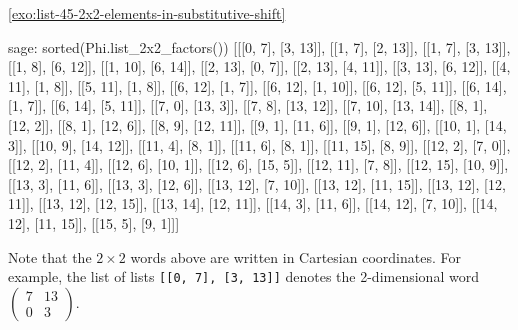 \documentclass[12pt]{amsart}
\begin{document}
\begin{exosolution}{\ref{exo:list-45-2x2-elements-in-substitutive-shift}}
\begin{sagecommandlinetcb}
\begin{sagecommandline}
sage: sorted(Phi.list_2x2_factors())
[[[0, 7], [3, 13]], [[1, 7], [2, 13]], [[1, 7], [3, 13]], [[1, 8], [6, 12]], [[1, 10], [6, 14]], [[2, 13], [0, 7]], [[2, 13], [4, 11]], [[3, 13], [6, 12]], [[4, 11], [1, 8]], [[5, 11], [1, 8]], [[6, 12], [1, 7]], [[6, 12], [1, 10]], [[6, 12], [5, 11]], [[6, 14], [1, 7]], [[6, 14], [5, 11]], [[7, 0], [13, 3]], [[7, 8], [13, 12]], [[7, 10], [13, 14]], [[8, 1], [12, 2]], [[8, 1], [12, 6]], [[8, 9], [12, 11]], [[9, 1], [11, 6]], [[9, 1], [12, 6]], [[10, 1], [14, 3]], [[10, 9], [14, 12]], [[11, 4], [8, 1]], [[11, 6], [8, 1]], [[11, 15], [8, 9]], [[12, 2], [7, 0]], [[12, 2], [11, 4]], [[12, 6], [10, 1]], [[12, 6], [15, 5]], [[12, 11], [7, 8]], [[12, 15], [10, 9]], [[13, 3], [11, 6]], [[13, 3], [12, 6]], [[13, 12], [7, 10]], [[13, 12], [11, 15]], [[13, 12], [12, 11]], [[13, 12], [12, 15]], [[13, 14], [12, 11]], [[14, 3], [11, 6]], [[14, 12], [7, 10]], [[14, 12], [11, 15]], [[15, 5], [9, 1]]]
\end{sagecommandline}
\end{sagecommandlinetcb}
Note that the $2\times2$ words above are written in Cartesian coordinates.
    For example, the list of lists \texttt{[[0, 7], [3, 13]]}
    denotes the 2-dimensional word
    $\left(\begin{smallmatrix}7 & 13\\ 0 & 3\end{smallmatrix}\right)$.
\end{exosolution}
\end{document}
